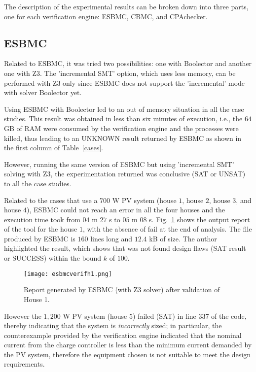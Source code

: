 The description of the experimental results can be broken down into three parts, one for each verification engine: ESBMC, CBMC, and CPAchecker. 

\subsection{ESBMC}
\label{sec:ESBMCverification}

Related to ESBMC, it was tried two possibilities: one with Boolector and another one with Z3. The 'incremental SMT' option, which uses less memory, can be performed with Z3 only since ESBMC does not support the 'incremental' mode with solver Boolector yet. 

Using ESBMC with Boolector led to an out of memory situation in all the case studies. This result was obtained in less than six minutes of execution, i.e., the $64$ GB of RAM were consumed by the verification engine and the processes were killed, thus leading to an UNKNOWN result returned by ESBMC as shown in the first column of Table~\ref{cases}. 

However, running the same version of ESBMC but using 'incremental SMT' solving with Z3, the experimentation returned was conclusive (SAT or UNSAT) to all the case studies. 

Related to the cases that use a $700$ W PV system (house $1$, house $2$, house $3$, and house $4$), ESBMC could not reach an error in all the four houses and the execution time took from $04$ m $27$ s to $05$ m $08$ s. Fig.~\ref{fig:esbmcverifhouse1} shows the output report of the tool for the house $1$, with the absence of fail at the end of analysis. The file produced by ESBMC is $160$ lines long and $12.4$ kB of size. The author highlighted the result, which shows that was not found design flaws (SAT result or SUCCESS) within the bound $k$ of $100$.

\begin{figure}[h]
\texttt{[image: esbmcverifh1.png]}
\centering
\caption{Report generated by ESBMC (with Z3 solver) after validation of House 1.}
\label{fig:esbmcverifhouse1}
\end{figure}

However the $1,200$ W PV system (house $5$) failed (SAT) in line $337$ of the code, thereby indicating that the system is \textit{incorrectly} sized; in particular, the counterexample provided by the verification engine indicated that the nominal current from the charge controller is less than the minimum current demanded by the PV system, therefore the equipment chosen is not suitable to meet the design requirements.

